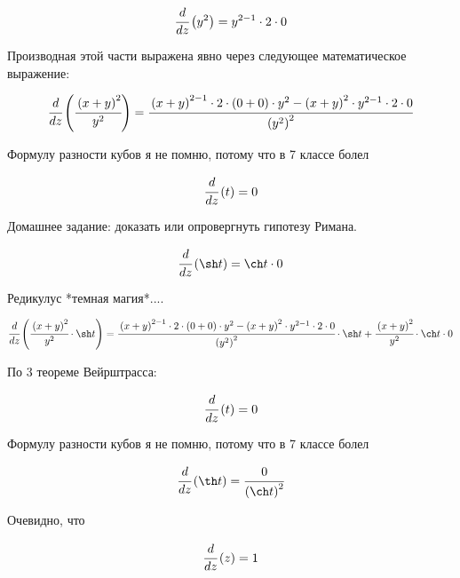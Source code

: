 \begin{dmath}
 \cfrac{d}{d z} \left( y^{2} \right) = y^{2 - 1} \cdot 2 \cdot 0 
\end{dmath}


Производная этой части выражена явно через следующее математическое выражение:


\begin{dmath}
 \cfrac{d}{d z} \left( \cfrac{\left(x + y\right)^{2}}{y^{2}} \right) = \cfrac{\left(x + y\right)^{2 - 1} \cdot 2 \cdot \left(0 + 0\right) \cdot y^{2} - \left(x + y\right)^{2} \cdot y^{2 - 1} \cdot 2 \cdot 0}{\left(y^{2}\right)^{2}} 
\end{dmath}


Формулу разности кубов я не помню, потому что в 7 классе болел


\begin{dmath}
 \cfrac{d}{d z} \left( t \right) = 0 
\end{dmath}


Домашнее задание: доказать или опровергнуть гипотезу Римана.


\begin{dmath}
 \cfrac{d}{d z} \left( \sh t \right) = \ch t \cdot 0 
\end{dmath}


Редикулус *темная магия*....


\begin{dmath}
 \cfrac{d}{d z} \left( \cfrac{\left(x + y\right)^{2}}{y^{2}} \cdot \sh t \right) = \cfrac{\left(x + y\right)^{2 - 1} \cdot 2 \cdot \left(0 + 0\right) \cdot y^{2} - \left(x + y\right)^{2} \cdot y^{2 - 1} \cdot 2 \cdot 0}{\left(y^{2}\right)^{2}} \cdot \sh t + \cfrac{\left(x + y\right)^{2}}{y^{2}} \cdot \ch t \cdot 0 
\end{dmath}


По 3 теореме Вейрштрасса:


\begin{dmath}
 \cfrac{d}{d z} \left( t \right) = 0 
\end{dmath}


Формулу разности кубов я не помню, потому что в 7 классе болел


\begin{dmath}
 \cfrac{d}{d z} \left( \th t \right) = \cfrac{0}{\left(\ch t\right)^{2}} 
\end{dmath}


Очевидно, что 


\begin{dmath}
 \cfrac{d}{d z} \left( z \right) = 1 
\end{dmath}


